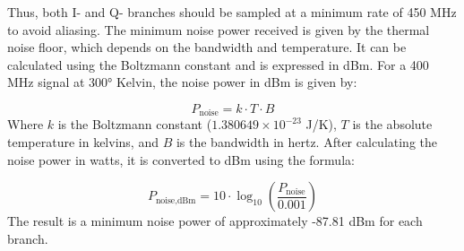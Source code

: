 \documentclass{article}
\begin{document}
\noindent
Thus, both I- and Q- branches should be sampled at a minimum rate of 450 MHz to avoid aliasing.
\newline\newline
The minimum noise power received is given by the thermal noise floor, which depends on the bandwidth and temperature. It can be calculated using the Boltzmann constant and is expressed in dBm. For a 400 MHz signal at 300° Kelvin, the noise power in dBm is given by:

\[ P_{\text{noise}} = k \cdot T \cdot B \]
\noindent
Where \( k \) is the Boltzmann constant (\( 1.380649 \times 10^{-23} \) J/K), \( T \) is the absolute temperature in kelvins, and \( B \) is the bandwidth in hertz. After calculating the noise power in watts, it is converted to dBm using the formula:

\[ P_{\text{noise,dBm}} = 10 \cdot \log_{10}\left(\frac{P_{\text{noise}}}{0.001}\right) \]
\noindent
The result is a minimum noise power of approximately -87.81 dBm for each branch.
\end{document}
